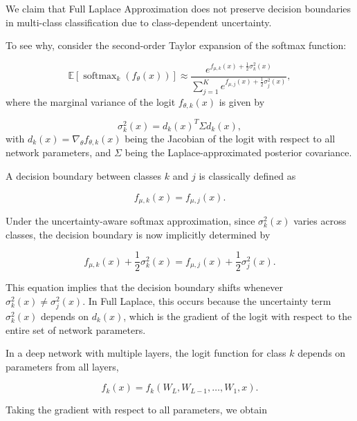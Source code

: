 \documentclass{article}
\begin{document}
We claim that Full Laplace Approximation does not preserve decision boundaries in multi-class classification due to class-dependent uncertainty.

To see why, consider the second-order Taylor expansion of the softmax function:

\begin{equation}
    \mathbb{E} \left[ \operatorname{softmax}_k(f_{\theta}(x)) \right] \approx \frac{e^{f_{\mu,k}(x) + \frac{1}{2} \sigma_k^2(x)}}{\sum_{j=1}^{K} e^{f_{\mu,j}(x) + \frac{1}{2} \sigma_j^2(x)}},
\end{equation}
where the marginal variance of the logit \( f_{\theta,k}(x) \) is given by

\begin{equation}
    \sigma_k^2(x) = d_k(x)^T \Sigma d_k(x),
\end{equation}
with \( d_k(x) = \nabla_{\theta} f_{\theta,k}(x) \) being the Jacobian of the logit with respect to all network parameters, and \( \Sigma \) being the Laplace-approximated posterior covariance.

A decision boundary between classes \( k \) and \( j \) is classically defined as

\begin{equation}
    f_{\mu,k}(x) = f_{\mu,j}(x).
\end{equation}

Under the uncertainty-aware softmax approximation, since \( \sigma_k^2(x) \) varies across classes, the decision boundary is now implicitly determined by

\begin{equation}
    f_{\mu,k}(x) + \frac{1}{2} \sigma_k^2(x) = f_{\mu,j}(x) + \frac{1}{2} \sigma_j^2(x).
\end{equation}

This equation implies that the decision boundary shifts whenever \( \sigma_k^2(x) \neq \sigma_j^2(x) \). In Full Laplace, this occurs because the uncertainty term \( \sigma_k^2(x) \) depends on \( d_k(x) \), which is the gradient of the logit with respect to the entire set of network parameters. 

In a deep network with multiple layers, the logit function for class \( k \) depends on parameters from all layers,

\begin{equation}
    f_k(x) = f_k(W_L, W_{L-1}, \dots, W_1, x).
\end{equation}

Taking the gradient with respect to all parameters, we obtain
\end{document}
